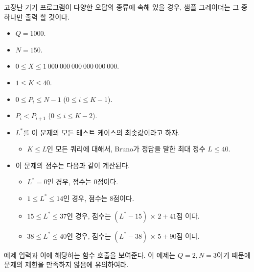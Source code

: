 \begin{problem}{고장난 기기}
	프로그램이 다양한 오답의 종류에 속해 있을 경우, 샘플 그레이더는 그 중 하나만 출력 할 것이다.
	
	\Constraints
	\begin{itemize}
		\item $Q = 1000$.
		\item $N = 150$.
		\item $0 \le X \le 1\ 000\ 000\ 000\ 000\ 000\ 000$.
		\item $1 \le K \le 40$.
		\item $0 \le P_i \le N-1$ ($0 \le i \le K-1$).
		\item $P_i < P_{i+1}$ ($0 \le i \le K-2$).
	\end{itemize}
	
	\Scoring
	
	\begin{itemize}
		\item $L^*$를 이 문제의 모든 테스트 케이스의 최솟값이라고 하자.
		\begin{itemize}
			\item $K \le L$인 모든 쿼리에 대해서, Bruno가 정답을 말한 최대 정수 $L \le 40$.
		\end{itemize}
		\item 이 문제의 점수는 다음과 같이 계산된다.
		\begin{itemize}
			\item $L^* = 0$인 경우, 점수는 0점이다.
			\item $1 \le L^* \le 14$인 경우, 점수는 8점이다.
			\item $15 \le L^* \le 37$인 경우, 점수는 $(L^* - 15)$ × $2 + 41$점 이다.
			\item $38 \le L^* \le 40$인 경우, 점수는 $(L^* - 38)$ × $5 + 90$점 이다.
		\end{itemize}
	\end{itemize}
	
	

	\Examples
	
	예제 입력과 이에 해당하는 함수 호출을 보여준다. 이 예제는 $Q=2, N=3$이기 때문에 문제의 제한을 만족하지 않음에 유의하여라.
	
	
	

\end{problem}
